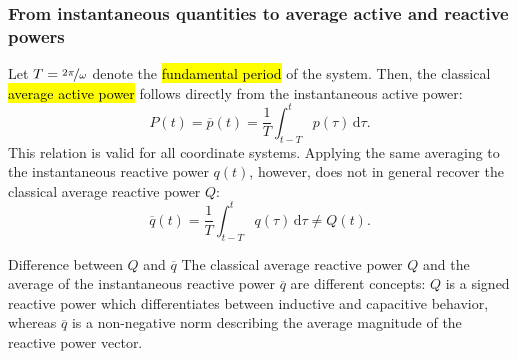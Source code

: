 \begin{frame}
    \frametitle{From instantaneous quantities to average active and reactive powers}
    Let $T=\nicefrac{2\pi}{\omega}$ denote the \hl{fundamental period} of the system. \pause Then, the classical \hl{average active power} follows directly from the instantaneous active power:
    \begin{equation}
        P(t)=\overline{p}(t)=\frac{1}{T}\int_{t-T}^{t} p(\tau)\,\mathrm{d}\tau.
    \end{equation}\pause
    This relation is valid for all coordinate systems. Applying the same averaging to the instantaneous reactive power $q(t)$, however, does not in general recover the classical average reactive power $Q$:
    \begin{equation}
        \overline{q}(t)=\frac{1}{T}\int_{t-T}^{t} q(\tau)\,\mathrm{d}\tau \neq Q(t).
    \end{equation}\pause\vspace{-0.3cm}
    \begin{varblock}{Difference between $Q$ and $\overline{q}$}
        The classical average reactive power $Q$ and the average of the instantaneous reactive power $\overline{q}$ are different concepts: $Q$ is a signed reactive power which differentiates between inductive and capacitive behavior, whereas $\overline{q}$ is a non-negative norm describing the average magnitude of the reactive power vector.
    \end{varblock}

\end{frame}


